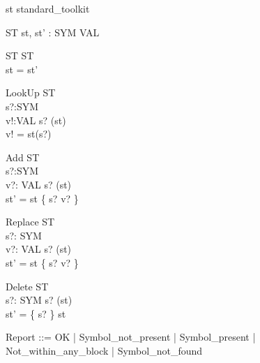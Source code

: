 \begin{zsection}
  \SECTION st \parents standard\_toolkit
\end{zsection}

\begin{zed}
\end{zed}


\begin{schema}{\Delta ST}
 st, st' : SYM \pfun VAL \\
\end{schema}


\begin{schema}{\Xi ST}
  \Delta ST \\
\where
  st = st'
\end{schema}

\begin{schema}{LookUp}
  \Xi ST \\
  s?:SYM \\
  v!:VAL
\where
  s? \in \dom(st) \\
  v! = st(s?)
\end{schema}

\begin{schema}{Add}
  \Delta ST \\
  s?:SYM \\
  v?: VAL
\where
  s? \notin \dom(st) \\
  st' = st \cup \{ s? \mapsto v? \}
\end{schema}

\begin{schema}{Replace}
  \Delta ST \\
  s?: SYM \\
  v?: VAL
\where
  s? \in \dom(st) \\
  st' = st \oplus \{ s? \mapsto v? \}
\end{schema}

\begin{schema}{Delete}
  \Delta ST \\
  s?: SYM
\where
 s? \in \dom(st) \\
  st' = \{ s? \} \ndres st
\end{schema}

\begin{zed}
  Report ::= OK
                  | Symbol\_not\_present
		  | Symbol\_present
		  | Not\_within\_any\_block
		  | Symbol\_not\_found
\end{zed}

